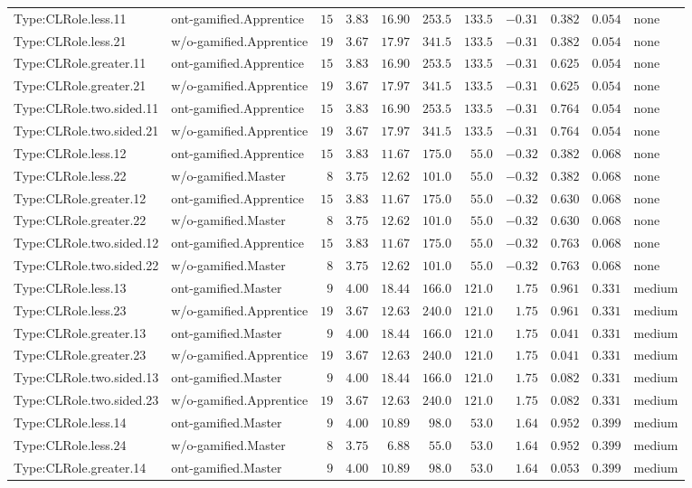 \documentclass[6pt,a4paper]{article}
\begin{document}
{\begin{longtable}{llrrrrrrrrl}
Type:CLRole.less.11&ont-gamified.Apprentice&$15$&$3.83$&$16.90$&$253.5$&$133.5$&$-0.31$&$0.382$&$0.054$&none\tabularnewline
Type:CLRole.less.21&w/o-gamified.Apprentice&$19$&$3.67$&$17.97$&$341.5$&$133.5$&$-0.31$&$0.382$&$0.054$&none\tabularnewline
Type:CLRole.greater.11&ont-gamified.Apprentice&$15$&$3.83$&$16.90$&$253.5$&$133.5$&$-0.31$&$0.625$&$0.054$&none\tabularnewline
Type:CLRole.greater.21&w/o-gamified.Apprentice&$19$&$3.67$&$17.97$&$341.5$&$133.5$&$-0.31$&$0.625$&$0.054$&none\tabularnewline
Type:CLRole.two.sided.11&ont-gamified.Apprentice&$15$&$3.83$&$16.90$&$253.5$&$133.5$&$-0.31$&$0.764$&$0.054$&none\tabularnewline
Type:CLRole.two.sided.21&w/o-gamified.Apprentice&$19$&$3.67$&$17.97$&$341.5$&$133.5$&$-0.31$&$0.764$&$0.054$&none\tabularnewline
Type:CLRole.less.12&ont-gamified.Apprentice&$15$&$3.83$&$11.67$&$175.0$&$ 55.0$&$-0.32$&$0.382$&$0.068$&none\tabularnewline
Type:CLRole.less.22&w/o-gamified.Master&$ 8$&$3.75$&$12.62$&$101.0$&$ 55.0$&$-0.32$&$0.382$&$0.068$&none\tabularnewline
Type:CLRole.greater.12&ont-gamified.Apprentice&$15$&$3.83$&$11.67$&$175.0$&$ 55.0$&$-0.32$&$0.630$&$0.068$&none\tabularnewline
Type:CLRole.greater.22&w/o-gamified.Master&$ 8$&$3.75$&$12.62$&$101.0$&$ 55.0$&$-0.32$&$0.630$&$0.068$&none\tabularnewline
Type:CLRole.two.sided.12&ont-gamified.Apprentice&$15$&$3.83$&$11.67$&$175.0$&$ 55.0$&$-0.32$&$0.763$&$0.068$&none\tabularnewline
Type:CLRole.two.sided.22&w/o-gamified.Master&$ 8$&$3.75$&$12.62$&$101.0$&$ 55.0$&$-0.32$&$0.763$&$0.068$&none\tabularnewline
Type:CLRole.less.13&ont-gamified.Master&$ 9$&$4.00$&$18.44$&$166.0$&$121.0$&$ 1.75$&$0.961$&$0.331$&medium\tabularnewline
Type:CLRole.less.23&w/o-gamified.Apprentice&$19$&$3.67$&$12.63$&$240.0$&$121.0$&$ 1.75$&$0.961$&$0.331$&medium\tabularnewline
Type:CLRole.greater.13&ont-gamified.Master&$ 9$&$4.00$&$18.44$&$166.0$&$121.0$&$ 1.75$&$0.041$&$0.331$&medium\tabularnewline
Type:CLRole.greater.23&w/o-gamified.Apprentice&$19$&$3.67$&$12.63$&$240.0$&$121.0$&$ 1.75$&$0.041$&$0.331$&medium\tabularnewline
Type:CLRole.two.sided.13&ont-gamified.Master&$ 9$&$4.00$&$18.44$&$166.0$&$121.0$&$ 1.75$&$0.082$&$0.331$&medium\tabularnewline
Type:CLRole.two.sided.23&w/o-gamified.Apprentice&$19$&$3.67$&$12.63$&$240.0$&$121.0$&$ 1.75$&$0.082$&$0.331$&medium\tabularnewline
Type:CLRole.less.14&ont-gamified.Master&$ 9$&$4.00$&$10.89$&$ 98.0$&$ 53.0$&$ 1.64$&$0.952$&$0.399$&medium\tabularnewline
Type:CLRole.less.24&w/o-gamified.Master&$ 8$&$3.75$&$ 6.88$&$ 55.0$&$ 53.0$&$ 1.64$&$0.952$&$0.399$&medium\tabularnewline
Type:CLRole.greater.14&ont-gamified.Master&$ 9$&$4.00$&$10.89$&$ 98.0$&$ 53.0$&$ 1.64$&$0.053$&$0.399$&medium\tabularnewline

\end{longtable}}
\end{document}
